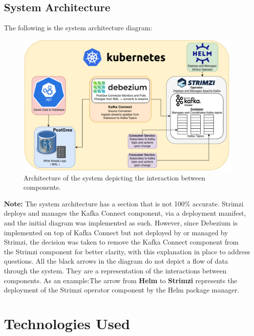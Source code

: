 \begin{flushleft}
	\subsection{System Architecture}
	The following is the system architecture diagram:
	\begin{figure}[ht]
		\begin{center}
			\includegraphics[width=1\textwidth]{figures/architecture_v2.png}
			\caption{Architecture of the system depicting the interaction between components.}
			\label{fig: 1.1}
		\end{center}
	\end{figure}
	\bigbreak
	\textbf{Note:} The system architecture has a section that is not 100\% accurate. Strimzi deploys and manages the Kafka Connect component, via a deployment manifest,
	and the initial diagram was implemented as such. However, since Debezium is implemented on top of Kafka Connect but not deployed by or managed by Strimzi, the decision
	was taken to remove the Kafka Connect component	from the Strimzi component for better clarity, with this explanation in place to address questions.
	\bigbreak
	All the black arrows in the diagram do not depict a flow of data through the system. They are a representation of the interactions between
	components. As an example:\newline The arrow from \textbf{Helm}	to \textbf{Strimzi} represents the deployment of the Strimzi operator component by the
	Helm package manager.
	\section{Technologies Used}

\end{flushleft}
